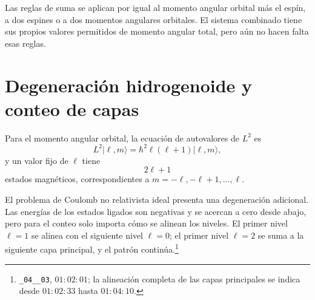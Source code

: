 Las reglas de suma se aplican por igual al momento angular orbital más el espín, a dos espines o a dos momentos angulares orbitales. El sistema combinado tiene sus propios valores permitidos de momento angular total, pero aún no hacen falta esas reglas.

\begin{classroomqa}
\end{classroomqa}

\section{Degeneración hidrogenoide y conteo de capas}

Para el momento angular orbital, la ecuación de autovalores de \(L^{2}\) es
\begin{equation}
L^{2}\lvert\ell,m\rangle
=\hbar^{2}\ell(\ell+1)\lvert\ell,m\rangle,
\end{equation}
y un valor fijo de \(\ell\) tiene
\begin{equation}
2\ell+1
\end{equation}
estados magnéticos, correspondientes a \(m=-\ell,-\ell+1,\ldots,\ell\).

El problema de Coulomb no relativista ideal presenta una degeneración adicional. Las energías de los estados ligados son negativas y se acercan a cero desde abajo, pero para el conteo solo importa cómo se alinean los niveles. El primer nivel \(\ell=1\) se alinea con el siguiente nivel \(\ell=0\); el primer nivel \(\ell=2\) se suma a la siguiente capa principal, y el patrón continúa.\footnote{\texttt{\_04\_\_03}, \(01{:}02{:}01\); la alineación completa de las capas principales se indica desde \(01{:}02{:}33\) hasta \(01{:}04{:}10\).}

